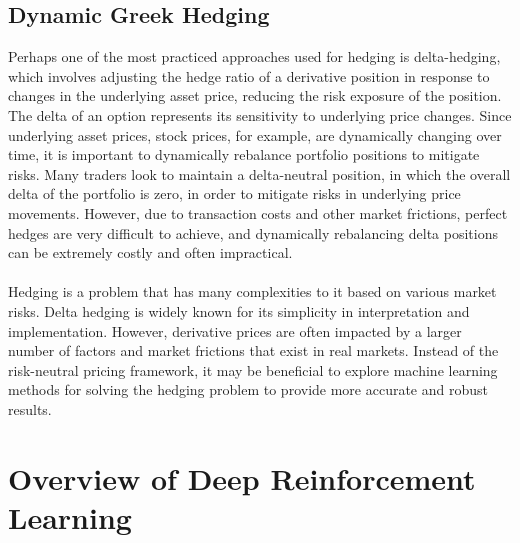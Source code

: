 \subsection{Dynamic Greek Hedging}

Perhaps one of the most practiced approaches used for hedging is delta-hedging, which involves adjusting the hedge ratio of a derivative position in response to changes in the underlying asset price, reducing the risk exposure of the position. The delta of an option represents its sensitivity to underlying price changes. Since underlying asset prices, stock prices, for example, are dynamically changing over time, it is important to dynamically rebalance portfolio positions to mitigate risks. Many traders look to maintain a delta-neutral position, in which the overall delta of the portfolio is zero, in order to mitigate risks in underlying price movements. However, due to transaction costs and other market frictions, perfect hedges are very difficult to achieve, and dynamically rebalancing delta positions can be extremely costly and often impractical.
\\ \\
Hedging is a problem that has many complexities to it based on various market risks. Delta hedging is widely known for its simplicity in interpretation and implementation. However, derivative prices are often impacted by a larger number of factors and market frictions that exist in real markets. Instead of the risk-neutral pricing framework, it may be beneficial to explore machine learning methods for solving the hedging problem to provide more accurate and robust results.

\section{Overview of Deep Reinforcement Learning}

